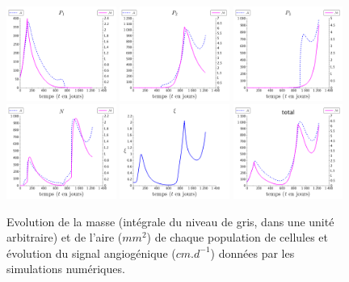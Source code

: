 \documentclass[11pt]{amsart}
\numberwithin{equation}{section}
\begin{document}
\begin{figure}[h]
\includegraphics[width=0.32\textwidth]{fit_henbert_form3/P1.png} 
\includegraphics[width=0.32\textwidth]{fit_henbert_form3/P2.png} 
\includegraphics[width=0.32\textwidth]{fit_henbert_form3/P3.png}\\
\includegraphics[width=0.32\textwidth]{fit_henbert_form3/N.png} 
\includegraphics[width=0.32\textwidth]{fit_henbert_form3/xi.png} 
\includegraphics[width=0.32\textwidth]{fit_henbert_form3/total.png}
\caption{Evolution de la masse (intégrale du niveau de gris, dans une unité arbitraire) et de l'aire ($mm^2$) de chaque population de cellules et évolution du signal angiogénique ($cm.d^{-1}$) données par les simulations numériques.} \label{fig:simu_henbert_mass_area}
\end{figure}
\end{document}

